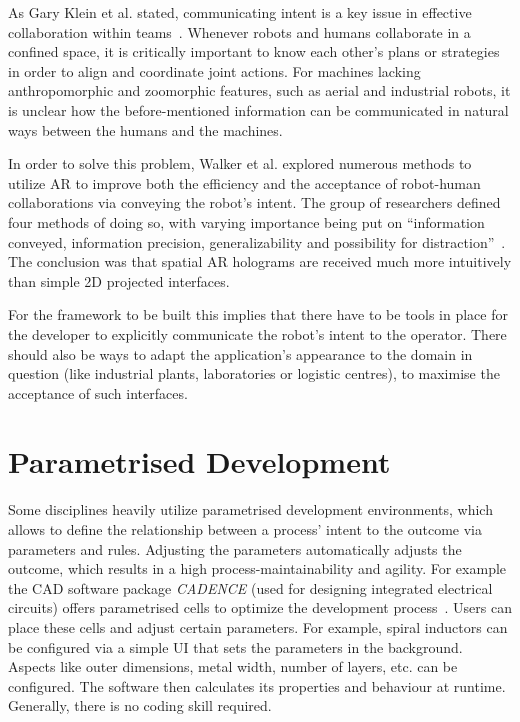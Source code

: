 As Gary Klein et al. stated, communicating intent is a key issue in effective collaboration within teams~\cite{klein2005common}. Whenever robots and humans collaborate in a confined space, it is critically important to know each other’s plans or strategies in order to align and coordinate joint actions. For machines lacking anthropomorphic and zoomorphic features, such as aerial and industrial robots, it is unclear how the before-mentioned information can be communicated in natural ways between the humans and the machines.

In order to solve this problem, Walker et al. \cite{walker2018communicating} explored numerous methods to utilize AR to improve both the efficiency and the acceptance of robot-human collaborations via conveying the robot's intent. The group of researchers defined four methods of doing so, with varying importance being put on “information conveyed, information precision, generalizability and possibility for distraction”~\cite{walker2018communicating}. The conclusion was that spatial AR holograms are received much more intuitively than simple 2D projected interfaces.

For the framework to be built this implies that there have to be tools in place for the developer to explicitly communicate the robot's intent to the operator. There should also be ways to adapt the application's appearance to the domain in question (like industrial plants, laboratories or logistic centres), to maximise the acceptance of such interfaces.

\section{Parametrised Development}\label{Section:ParametricDesignIntoduction}
Some disciplines heavily utilize parametrised development environments, which allows to define the relationship between a process' intent to the outcome via parameters and rules. Adjusting the parameters automatically adjusts the outcome, which results in a high process-maintainability and agility. For example the CAD software package \textit{CADENCE} (used for designing integrated electrical circuits) offers parametrised cells to optimize the development process~\cite{parametrizedCellElectricalInductor}. Users can place these cells and adjust certain parameters. For example, spiral inductors can be configured via a simple UI that sets the parameters in the background. Aspects like outer dimensions, metal width, number of layers, etc. can be configured. The software then calculates its properties and behaviour at runtime. Generally, there is no coding skill required.

